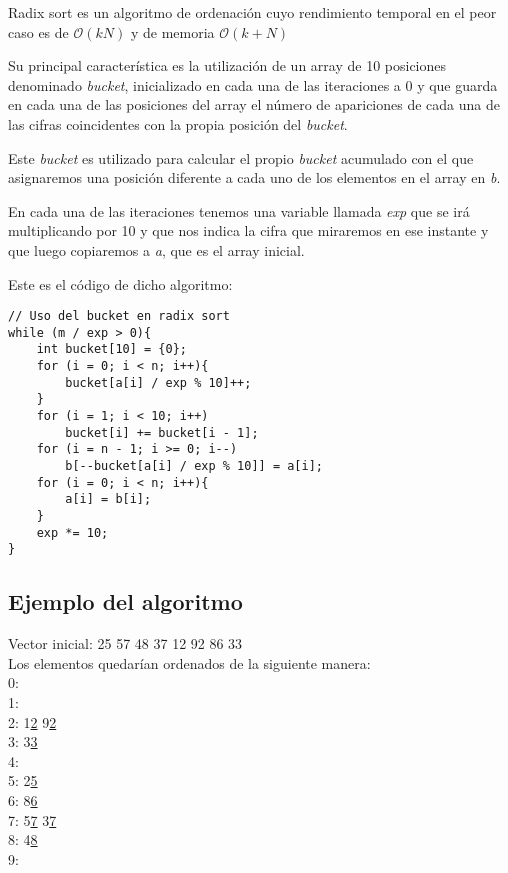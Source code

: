 Radix sort es un algoritmo de ordenación cuyo rendimiento temporal en el peor caso es de $\mathcal{O}(kN)$ y de memoria $\mathcal{O}(k + N)$

Su principal característica es la utilización de un array de 10 posiciones denominado \emph{bucket}, inicializado en cada una de las iteraciones a 0 y que guarda en cada una de las posiciones del array el número de apariciones de cada una de las cifras coincidentes con la propia posición del \emph{bucket}.

Este \emph{bucket} es utilizado para calcular el propio \emph{bucket} acumulado con el que asignaremos una posición diferente a cada uno de los elementos en el array en \emph{b}.

En cada una de las iteraciones tenemos una variable llamada \emph{exp} que se irá multiplicando por 10 y que nos indica la cifra que miraremos en ese instante y que luego copiaremos a \emph{a}, que es el array inicial.

Este es el código de dicho algoritmo:

\begin{lstlisting}
// Uso del bucket en radix sort
while (m / exp > 0){
	int bucket[10] = {0};
	for (i = 0; i < n; i++){
		bucket[a[i] / exp % 10]++;
	}
	for (i = 1; i < 10; i++)
		bucket[i] += bucket[i - 1];
	for (i = n - 1; i >= 0; i--)
		b[--bucket[a[i] / exp % 10]] = a[i];
	for (i = 0; i < n; i++){
		a[i] = b[i];
	}
	exp *= 10;
}
\end{lstlisting}

\newpage
\subsection{Ejemplo del algoritmo}

Vector inicial: 25 57 48 37 12 92 86 33\\

Los elementos quedarían ordenados de la siguiente manera:\\
0:\\
1:\\
2: 1\underline{2} 9\underline{2}\\
3: 3\underline{3}\\
4:\\
5: 2\underline{5}\\
6: 8\underline{6}\\
7: 5\underline{7} 3\underline{7}\\
8: 4\underline{8}\\
9:\\

